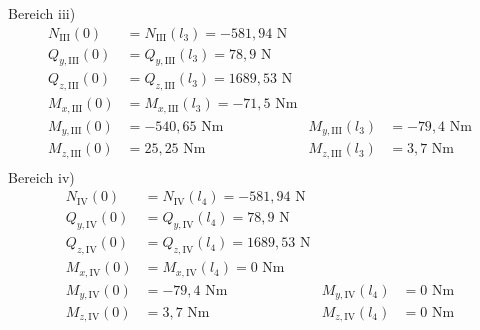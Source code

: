 Bereich iii)
\begin{align*}
	N_{\mathrm{III}} (0) &= N_{\mathrm{III}} (l_3) = -581,94 \text{ N}\\
	Q_{y,\mathrm{III}} (0) &= Q_{y,\mathrm{III}} (l_3) =78,9\text{ N}\\
	Q_{z,\mathrm{III}} (0) &= Q_{z,\mathrm{III}} (l_3) = 1689,53\text{ N}\\
	M_{x,\mathrm{III}} (0) &= M_{x,\mathrm{III}} (l_3) = -71,5\text{ Nm}\\
	M_{y,\mathrm{III}} (0) &=  -540,65\text{ Nm} & M_{y,\mathrm{III}} (l_3) &= -79,4\text{ Nm}\\
	M_{z,\mathrm{III}} (0) &= 25,25\text{ Nm} &M_{z,\mathrm{III}} (l_3) &= 3,7\text{ Nm}\\
\end{align*}
Bereich iv)
\begin{align*}
	N_{\mathrm{IV}} (0) &= N_{\mathrm{IV}} (l_4) = -581,94 \text{ N}\\
	Q_{y,\mathrm{IV}} (0) &= Q_{y,\mathrm{IV}} (l_4) = 78,9\text{ N}\\
	Q_{z,\mathrm{IV}} (0) &= Q_{z,\mathrm{IV}} (l_4) = 1689,53\text{ N}\\
	M_{x,\mathrm{IV}} (0) &= M_{x,\mathrm{IV}} (l_4) = 0\text{ Nm}\\
	M_{y,\mathrm{IV}} (0) &=  -79,4\text{ Nm} & M_{y,\mathrm{IV}} (l_4) &= 0\text{ Nm}\\
	M_{z,\mathrm{IV}} (0) &= 3,7\text{ Nm} &M_{z,\mathrm{IV}} (l_4) &= 0\text{ Nm}\\
\end{align*}
\newpage
